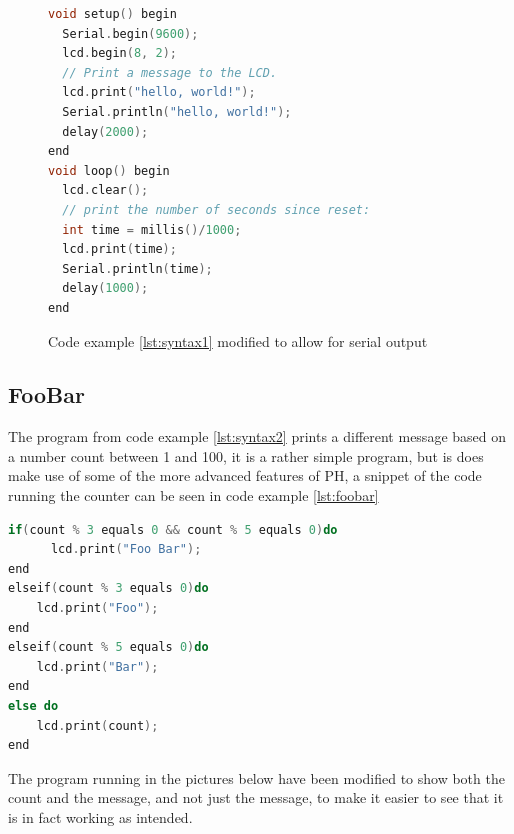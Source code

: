\begin{figure}[h!]
\begin{lstlisting}[caption=Hello World with serial output, language={C++},label=lst:serial]
void setup() begin
  Serial.begin(9600);
  lcd.begin(8, 2);
  // Print a message to the LCD.
  lcd.print("hello, world!");
  Serial.println("hello, world!");
  delay(2000);
end
void loop() begin
  lcd.clear();
  // print the number of seconds since reset:
  int time = millis()/1000; 
  lcd.print(time);
  Serial.println(time);
  delay(1000);
end
\end{lstlisting}
\caption{Code example \ref{lst:syntax1} modified to allow for serial output}
\end{figure}

\subsection*{FooBar}
The program from code example \ref{lst:syntax2} prints a different message based on a number count between 1 and 100, it is a rather simple program, but is does make use of some of the more advanced features of PH, a snippet of the code running the counter can be seen in code example \ref{lst:foobar}
\begin{lstlisting}[caption=Hello World with serial output,firstnumber=26, language={C++},label=lst:foobar]
if(count % 3 equals 0 && count % 5 equals 0)do
      lcd.print("Foo Bar"); 
end
elseif(count % 3 equals 0)do
    lcd.print("Foo");
end
elseif(count % 5 equals 0)do
    lcd.print("Bar");
end
else do
    lcd.print(count);
end
\end{lstlisting}

The program running in the pictures below have been modified to show both the count and the message, and not just the message, to make it easier to see that it is in fact working as intended.


